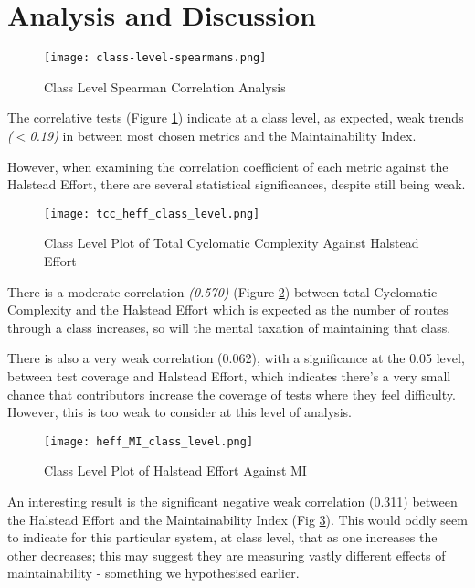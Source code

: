 \section{Analysis and Discussion}

\begin{figure}[H]
	\texttt{[image: class-level-spearmans.png]}
	\caption{Class Level Spearman Correlation Analysis}
	\label{fig:classLevelSpearmans}  
\end{figure}

The correlative tests (Figure \ref{fig:classLevelSpearmans}) indicate at a class level, as expected, weak trends \textit{($<$0.19)} in between most chosen metrics and the Maintainability Index. 

However, when examining the correlation coefficient of each metric against the Halstead Effort, there are several statistical significances, despite still being weak. 

\begin{figure}[H]
	\texttt{[image: tcc\_heff\_class\_level.png]}
	\caption{Class Level Plot of Total Cyclomatic Complexity Against Halstead Effort}
	\label{fig:tccHeffClassLevel}  
\end{figure}

There is a moderate correlation \textit{(0.570)} (Figure \ref{fig:tccHeffClassLevel}) between total Cyclomatic Complexity and the Halstead Effort which is expected as the number of routes through a class increases, so will the mental taxation of maintaining that class. 

There is also a very weak correlation (0.062), with a significance at the 0.05 level, between test coverage and Halstead Effort, which indicates there's a very small chance that contributors increase the coverage of tests where they feel difficulty. However, this is too weak to consider at this level of analysis.

\begin{figure}[H]
	\texttt{[image: heff\_MI\_class\_level.png]}
	\caption{Class Level Plot of Halstead Effort Against MI}
	\label{fig:heffMIClassLevel}  
\end{figure}

An interesting result is the significant negative weak correlation (0.311) between the Halstead Effort and the Maintainability Index (Fig \ref{fig:heffMIClassLevel}). This would oddly seem to indicate for this particular system, at class level, that as one increases the other decreases; this may suggest they are measuring vastly different effects of maintainability - something we hypothesised earlier.

